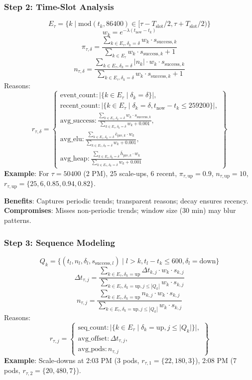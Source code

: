 \documentclass[12pt]{article}
\begin{document}
\subsubsection{Step 2: Time-Slot Analysis}
\[
E_\tau = \{k \mid \text{mod}(t_k, 86400) \in [\tau - T_{\text{slot}}/2, \tau + T_{\text{slot}}/2)\}
\]
\[
w_k = e^{-\lambda (t_{\text{now}} - t_k)}
\]
\[
\pi_{\tau,\delta} = \frac{\sum_{k \in E_\tau, \delta_k = \delta} w_k \cdot s_{\text{success},k}}{\sum_{k \in E_\tau} w_k \cdot s_{\text{success},k} + 1}
\]
\[
n_{\tau,\delta} = \frac{\sum_{k \in E_\tau, \delta_k = \delta} |n_k| \cdot w_k \cdot s_{\text{success},k}}{\sum_{k \in E_\tau, \delta_k = \delta} w_k \cdot s_{\text{success},k} + 1}
\]
Reasons:
\[
r_{\tau,\delta} = \left\{
\begin{array}{l}
\text{event\_count}: |\{k \in E_\tau \mid \delta_k = \delta\}|, \\
\text{recent\_count}: |\{k \in E_\tau \mid \delta_k = \delta, t_{\text{now}} - t_k \leq 259200\}|, \\
\text{avg\_success}: \frac{\sum_{k \in E_\tau, \delta_k = \delta} w_k \cdot s_{\text{success},k}}{\sum_{k \in E_\tau, \delta_k = \delta} w_k + 0.001}, \\
\text{avg\_elu}: \frac{\sum_{k \in E_\tau, \delta_k = \delta} \bar{e}_{\text{pre},k} \cdot w_k}{\sum_{k \in E_\tau, \delta_k = \delta} w_k + 0.001}, \\
\text{avg\_heap}: \frac{\sum_{k \in E_\tau, \delta_k = \delta} \bar{h}_{\text{pre},k} \cdot w_k}{\sum_{k \in E_\tau, \delta_k = \delta} w_k + 0.001}
\end{array}
\right\}
\]
\textbf{Example}: For \( \tau = 50400 \) (2 PM), 25 scale-ups, 6 recent, \( \pi_{\tau,\text{up}} = 0.9 \), \( n_{\tau,\text{up}} = 10 \), \( r_{\tau,\text{up}} = \{25, 6, 0.85, 0.94, 0.82\} \).

\textbf{Benefits}: Captures periodic trends; transparent reasons; decay ensures recency.
\textbf{Compromises}: Misses non-periodic trends; window size (30 min) may blur patterns.

\subsubsection{Step 3: Sequence Modeling}
\[
Q_k = \{(t_l, n_l, \delta_l, s_{\text{success},l}) \mid l > k, t_l - t_k \leq 600, \delta_l = \text{down}\}
\]
\[
\Delta t_{\tau,j} = \frac{\sum_{k \in E_\tau, \delta_k = \text{up}} \Delta t_{k,j} \cdot w_k \cdot s_{k,j}}{\sum_{k \in E_\tau, \delta_k = \text{up}, j \leq |Q_k|} w_k \cdot s_{k,j}}
\]
\[
n_{\tau,j} = \frac{\sum_{k \in E_\tau, \delta_k = \text{up}} n_{k,j} \cdot w_k \cdot s_{k,j}}{\sum_{k \in E_\tau, \delta_k = \text{up}, j \leq |Q_k|} w_k \cdot s_{k,j}}
\]
Reasons:
\[
r_{\tau,j} = \left\{
\begin{array}{l}
\text{seq\_count}: |\{k \in E_\tau \mid \delta_k = \text{up}, j \leq |Q_k|\}|, \\
\text{avg\_offset}: \Delta t_{\tau,j}, \\
\text{avg\_pods}: n_{\tau,j}
\end{array}
\right\}
\]
\textbf{Example}: Scale-downs at 2:03 PM (3 pods, \( r_{\tau,1} = \{22, 180, 3\} \)), 2:08 PM (7 pods, \( r_{\tau,2} = \{20, 480, 7\} \)).
\end{document}
